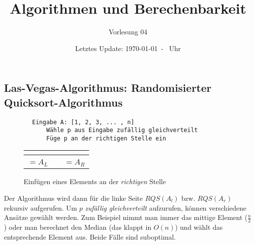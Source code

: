 \documentclass{scrartcl}%
\newcommand\underbracetext[1]{\raisebox{1ex}{\ensuremath{\underbrace{\hphantom{\text{#1}}}_{\text{\normalsize #1}}}}}
\begin{document}
    \subject{Vorlesungsmitschrieb}
    \title{Algorithmen und Berechenbarkeit}
    \subtitle{Vorlesung 04}
    \date{Letztes Update: \today \ - \currenttime \ Uhr}
    \maketitle


    \subsection*{Las-Vegas-Algorithmus: Randomisierter Quicksort-Algorithmus}
    \label{subsec:las-vegas-algorithmus:RandomisierterQuicksort-algorithmus}

    \begin{lstlisting}
        Eingabe A: [1, 2, 3, ... , n]
            Wähle p aus Eingabe zufällig gleichverteilt
            Füge p an der richtigen Stelle ein
    \end{lstlisting}

    \begin{figure}[htb]
        \centering

        \begin{tabular}{|C{1.5em}|C{1.5em}|C{1.5em}|C{1.5em}|C{1.5em}|C{1.5em}|C{1.5em}|C{1.5em}|}
            \hline
             &  & \\
            \hline
            \multicolumn{4}{c}{\underbracetext{\phantom{we dod } $<A[p]$ \phantom{we dod }}}  & & \multicolumn{3}{c}{\underbracetext{\phantom{wed } $>A[p]$ \phantom{wed }}}  \\
              & &  \\
        \end{tabular}

        \caption*{Einfügen eines Elements an der \textit{richtigen} Stelle}
    \end{figure}
    Der Algorithmus wird dann für die linke Seite $RQS(A_l)$ bzw. $RQS(A_r)$ rekursiv aufgerufen.
    Um $p$ \textit{zufällig gleichverteilt} aufzurufen, können verschiedene Ansätze gewählt werden.
    Zum Beispiel nimmt man immer das mittige Element ($\frac{n}{2}$)
    oder man berechnet den Median (das klappt in $O(n)$) und wählt das entsprechende Element aus.
    Beide Fälle sind suboptimal.
\end{document}
